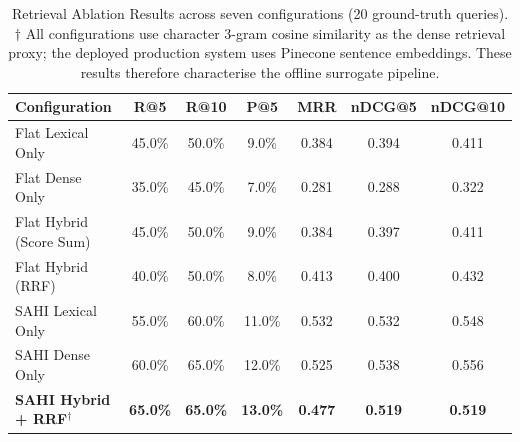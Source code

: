 \documentclass[11pt]{article}
\newcommand{\rev}[1]{#1}
\begin{document}
\vspace*{1cm}
\setcounter{table}{4}

\begin{table}[H]
\caption{\rev{Retrieval Ablation Results across seven configurations (20 ground-truth
queries). $\dagger$ All configurations use character 3-gram cosine similarity as the
dense retrieval proxy; the deployed production system uses Pinecone sentence embeddings.
These results therefore characterise the offline surrogate pipeline.}}
\label{tab:ablation}
\centering
\small
\begin{tabular}{lcccccc}
\hline
\textbf{Configuration} & \textbf{R@5} & \textbf{R@10} & \textbf{P@5}
  & \textbf{MRR} & \textbf{nDCG@5} & \textbf{nDCG@10} \\ \hline
Flat Lexical Only       & 45.0\% & 50.0\% &  9.0\% & 0.384 & 0.394 & 0.411 \\
Flat Dense Only         & 35.0\% & 45.0\% &  7.0\% & 0.281 & 0.288 & 0.322 \\
Flat Hybrid (Score Sum) & 45.0\% & 50.0\% &  9.0\% & 0.384 & 0.397 & 0.411 \\
Flat Hybrid (RRF)       & 40.0\% & 50.0\% &  8.0\% & 0.413 & 0.400 & 0.432 \\
SAHI Lexical Only       & 55.0\% & 60.0\% & 11.0\% & 0.532 & 0.532 & 0.548 \\
SAHI Dense Only         & 60.0\% & 65.0\% & 12.0\% & 0.525 & 0.538 & 0.556 \\
\textbf{SAHI Hybrid + RRF$^\dagger$}  & \textbf{65.0\%} & \textbf{65.0\%} & \textbf{13.0\%}
  & \textbf{0.477} & \textbf{0.519} & \textbf{0.519} \\ \hline
\end{tabular}
\end{table}
\end{document}

